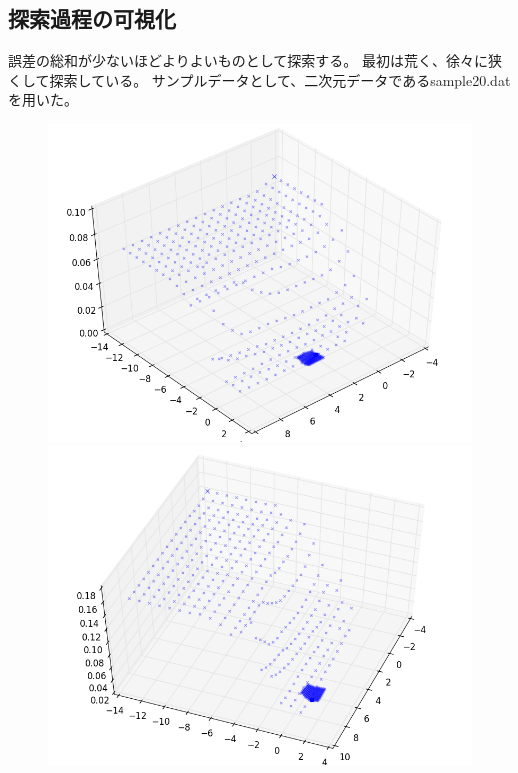 \documentclass[]{jsarticle}
\begin{document}
\subsection{探索過程の可視化}
誤差の総和が少ないほどよりよいものとして探索する。
最初は荒く、徐々に狭くして探索している。
サンプルデータとして、二次元データであるsample20.datを用いた。
\begin{figure}[htbp]
 \begin{minipage}[b]{0.5\hsize}
  \includegraphics[scale=0.4]{./images/gauss_cross_sq.png}
 \end{minipage}
 \begin{minipage}[b]{0.5\hsize}
  \includegraphics[scale=0.4]{./images/gauss_corss_abs.png}

\end{minipage}
\end{figure}
\end{document}
